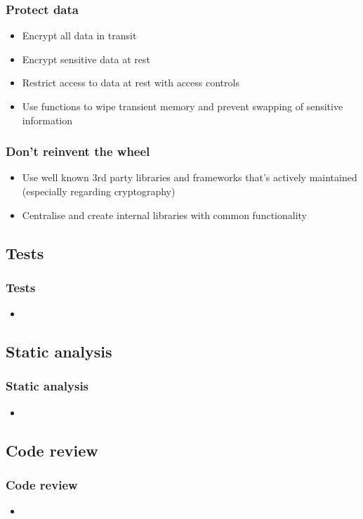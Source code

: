 \documentclass{beamer}
\begin{document}
    \begin{frame}
      \frametitle{Protect data}
      \begin{itemize}
        \item Encrypt all data in transit
        \item Encrypt sensitive data at rest
        \item Restrict access to data at rest with access controls
        \item Use functions to wipe transient memory and prevent swapping of sensitive information
      \end{itemize}
    \end{frame}
    \begin{frame}
      \frametitle{Don't reinvent the wheel}
      \begin{itemize}
        \item Use well known 3rd party libraries and frameworks that's actively maintained (especially regarding cryptography)
        \item Centralise and create internal libraries with common functionality
      \end{itemize}
    \end{frame}
  \subsection{Tests}
    \begin{frame}
      \frametitle{Tests}
      \begin{itemize}
        \item
      \end{itemize}
    \end{frame}

  \subsection{Static analysis}
    \begin{frame}
    \frametitle{Static analysis}
    \begin{itemize}
    \item
    \end{itemize}
    \end{frame}

  \subsection{Code review}
    \begin{frame}
    \frametitle{Code review}
    \begin{itemize}
    \item
    \end{itemize}
    \end{frame}
\end{document}
